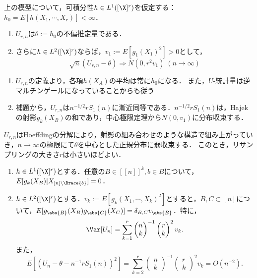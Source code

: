 \documentclass[uplatex,dvipdfmx]{jsreport}
\begin{document}
\begin{theorem}
    上の模型について，可積分性$h\in L^1([\X]^r)$を仮定する：$h_0=E[h(X_1,\cdots,X_r)]<\infty$．
    \begin{enumerate}
        \item $U_{r,n}$は$\theta:=h_0$の不偏推定量である．
        \item さらに$h\in L^2([\X]^r)$ならば，$v_1:=E[g_1(X_1)^2]>0$として，
        \[\sqrt{n}(U_{r,n}-\theta)\Rightarrow N(0,r^2v_1)\;(n\to\infty)\]
    \end{enumerate}
\end{theorem}
\begin{Proof}\mbox{}
    \begin{enumerate}
        \item $U_{r,n}$の定義より，各項$h(X_A)$の平均は常に$h_0$になる．
        また，$U$-統計量は逆マルチンゲールになっていることからも従う
        \item 補題から，$U_{r,n}$は$n^{-1/2}rS_1(n)$に漸近同等である．$n^{-1/2}rS_1(n)$は，Hajekの射影$g_k(X_B)$の和であり，中心極限定理から$N(0,v_1)$に分布収束する．
    \end{enumerate}
\end{Proof}
\begin{remarks}
    $U_{r,n}$はHoeffdingの分解により，射影の組み合わせのような構造で組み上がっていき，$n\to\infty$の極限にて$\theta$を中心とした正規分布に弱収束する．
    このとき，リサンプリングの大きさ$r$は小さいほどよい．
\end{remarks}

\begin{lemma}\mbox{}
    \begin{enumerate}
        \item $h\in L^1([\X]^r)$とする．任意の$B\in [[n]]^k,b\in B$について，$E[g_k(X_B)|X_{[n]\setminus\Brace{b}}]=0$．
        \item $h\in L^2([\X]^r)$とする．$v_k:=E[g_k(X_1,\cdots,X_k)^2]$とすると，$B,C\subset[n]$について，$E[g_{\abs{B}}(X_B)g_{\abs{C}}(X_C)]=\delta_{B,C}v_{\abs{B}}$．特に，
        \[\Var[U_n]=\sum_{k=1}^r \begin{pmatrix}n\\k\end{pmatrix}^{-1}\begin{pmatrix}r\\k\end{pmatrix}^2v_k.\]
        また，
        \[E[(U_n-\theta-n^{-1}rS_1(n))^2]=\sum_{k=2}^r\begin{pmatrix}n\\k\end{pmatrix}^{-1}\begin{pmatrix}r\\k\end{pmatrix}^2v_k=O(n^{-2}).\]
    \end{enumerate}
\end{lemma}
\end{document}
